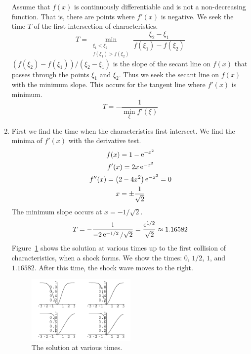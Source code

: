 \begin{Solution}
\begin{enumerate}
    Assume that $f(x)$ is continuously differentiable and is not a 
    non-decreasing function.  That is, there are points where $f'(x)$ is 
    negative.  We seek the time $T$ of the first intersection 
    of characteristics.
    \[
    T = \min_{\substack{\xi_1 < \xi_2 \\f(\xi_1) > f(\xi_2)}} \frac{\xi_2 - \xi_1}{f(\xi_1) - f(\xi_2)}
    \]
    $( f(\xi_2) - f(\xi_1) ) / ( \xi_2 - \xi_1 )$ is the slope of the secant line on $f(x)$
    that passes through the points $\xi_1$ and $\xi_2$.
    Thus we seek the secant line on $f(x)$ with the minimum slope.  This 
    occurs for the tangent line where $f'(x)$ is minimum.
    \[
    T = - \frac{1}{\min_{\xi} f'(\xi)}
    \]
  \item 
    First we find the time when the characteristics first intersect. We find
    the minima of $f'(x)$ with the derivative test.
    \begin{gather*}
      f(x) = 1 - \mathop{\mathrm{e}}\nolimits^{-x^2}
      \\
      f'(x) = 2 x \mathop{\mathrm{e}}\nolimits^{-x^2}
      \\
      f''(x) = \left( 2 - 4 x^2 \right) \mathop{\mathrm{e}}\nolimits^{-x^2} = 0
      \\
      x = \pm \frac{1}{\sqrt{2}}
    \end{gather*}
    The minimum slope occurs at $x = -1 / \sqrt{2}$.  
    \[
    T = - \frac{1}{- 2 \mathop{\mathrm{e}}\nolimits^{-1/2} / \sqrt{2} } = \frac{\mathop{\mathrm{e}}\nolimits^{1/2}}{\sqrt{2}} 
    \approx 1.16582
    \]
    Figure~\ref{burger1ex2} shows the solution at various times up to the first
    collision of characteristics, when a shock forms.  We show the times:
    $0$, $1/2$, $1$, and $1.16582$.
    After this time, the shock wave moves to the right.
    \begin{figure}[h!]
      \begin{center}
        \includegraphics[width=0.5\textwidth]{nde/npde/burger1ex2}
      \end{center}
      \caption{The solution at various times.}
      \label{burger1ex2}
    \end{figure}
  \end{enumerate}
\end{Solution}








